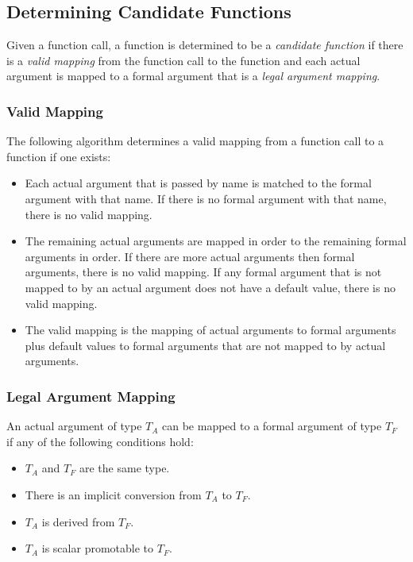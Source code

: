 \subsection{Determining Candidate Functions}
\label{Determining_Candidate_Functions}

Given a function call, a function is determined to be
a \emph{candidate function} if there is a \emph{valid mapping} from
the function call to the function and each actual argument is mapped
to a formal argument that is a \emph{legal argument mapping}.

\subsubsection{Valid Mapping}
\label{Valid_Mapping}

The following algorithm determines a valid mapping from a function
call to a function if one exists:
\begin{itemize}
\item
Each actual argument that is passed by name is matched to the formal
argument with that name.  If there is no formal argument with that
name, there is no valid mapping.
\item
The remaining actual arguments are mapped in order to the remaining
formal arguments in order.  If there are more actual arguments then
formal arguments, there is no valid mapping.  If any formal argument
that is not mapped to by an actual argument does not have a default
value, there is no valid mapping.
\item
The valid mapping is the mapping of actual arguments to formal
arguments plus default values to formal arguments that are not mapped
to by actual arguments.
\end{itemize}

\subsubsection{Legal Argument Mapping}
\label{Legal_Argument_Mapping}

An actual argument of type $T_A$ can be mapped to a formal argument of
type $T_F$ if any of the following conditions hold:
\begin{itemize}
\item $T_A$ and $T_F$ are the same type.
\item There is an implicit conversion from $T_A$ to $T_F$.
\item $T_A$ is derived from $T_F$.
\item $T_A$ is scalar promotable to $T_F$.
\end{itemize}

